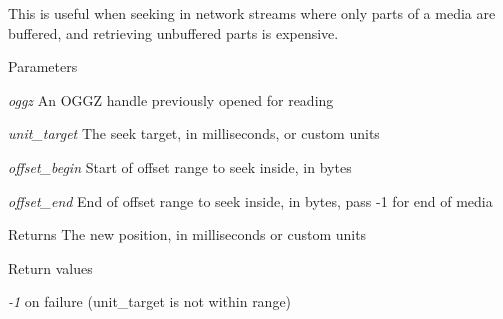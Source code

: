 This is useful when seeking in network streams where only parts of a media are buffered, and retrieving unbuffered parts is expensive. 
\begin{DoxyParams}{Parameters}
\item[{\em oggz}]An OGGZ handle previously opened for reading \item[{\em unit\_\-target}]The seek target, in milliseconds, or custom units \item[{\em offset\_\-begin}]Start of offset range to seek inside, in bytes \item[{\em offset\_\-end}]End of offset range to seek inside, in bytes, pass -\/1 for end of media \end{DoxyParams}
\begin{DoxyReturn}{Returns}
The new position, in milliseconds or custom units 
\end{DoxyReturn}

\begin{DoxyRetVals}{Return values}
\item[{\em -\/1}]on failure (unit\_\-target is not within range) \end{DoxyRetVals}
